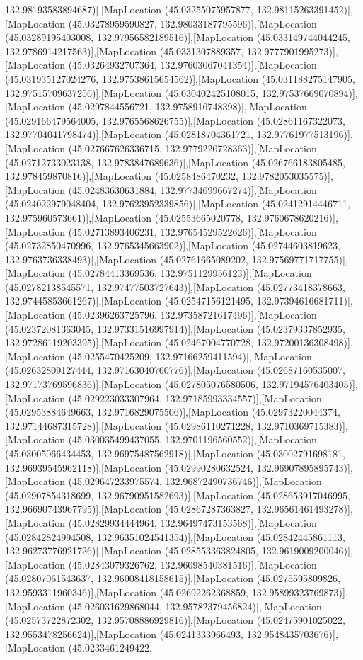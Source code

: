 132.98193583894687)],[MapLocation (45.03255075957877, 132.98115263391452)],[MapLocation (45.03278959590827, 132.98033187795596)],[MapLocation (45.03289195403008, 132.97956582189516)],[MapLocation (45.033149744044245, 132.9786914217563)],[MapLocation (45.0331307889357, 132.9777901995273)],[MapLocation (45.03264932707364, 132.97603067041354)],[MapLocation (45.031935127024276, 132.97538615654562)],[MapLocation (45.031188275147905, 132.97515709637256)],[MapLocation (45.030402425108015, 132.97537669070894)],[MapLocation (45.0297844556721, 132.9758916748398)],[MapLocation (45.029166479564005, 132.9765568626755)],[MapLocation (45.02861167322073, 132.97704041798474)],[MapLocation (45.02818704361721, 132.97761977513196)],[MapLocation (45.027667626336715, 132.9779220728363)],[MapLocation (45.02712733023138, 132.9783847689636)],[MapLocation (45.026766183805485, 132.978459870816)],[MapLocation (45.0258486470232, 132.9782053035575)],[MapLocation (45.02483630631884, 132.97734699667274)],[MapLocation (45.024022979048404, 132.97623952339856)],[MapLocation (45.02412914446711, 132.975960573661)],[MapLocation (45.02553665020778, 132.9760678620216)],[MapLocation (45.02713893406231, 132.97654529522626)],[MapLocation (45.02732850470996, 132.9765345663902)],[MapLocation (45.02744603819623, 132.9763736338493)],[MapLocation (45.02761665089202, 132.97569771717755)],[MapLocation (45.02784413369536, 132.9751129956123)],[MapLocation (45.02782138545571, 132.97477503727643)],[MapLocation (45.02773418378663, 132.97445853661267)],[MapLocation (45.02547156121495, 132.97394616681711)],[MapLocation (45.02396263725796, 132.97358721617496)],[MapLocation (45.02372081363045, 132.97331516997914)],[MapLocation (45.02379337852935, 132.97286119203395)],[MapLocation (45.02467004770728, 132.97200136308498)],[MapLocation (45.0255470425209, 132.97166259411594)],[MapLocation (45.02632809127444, 132.97163040760776)],[MapLocation (45.02687160535007, 132.97173769596836)],[MapLocation (45.027805076580506, 132.97194576403405)],[MapLocation (45.029223033307964, 132.97185993334557)],[MapLocation (45.02953884649663, 132.9716829075506)],[MapLocation (45.02973220044374, 132.97144687315728)],[MapLocation (45.02986110271228, 132.9710369715383)],[MapLocation (45.030035499437055, 132.9701196560552)],[MapLocation (45.03005066434453, 132.96975487562918)],[MapLocation (45.03002791698181, 132.96939545962118)],[MapLocation (45.02990280632524, 132.96907895895743)],[MapLocation (45.029647233975574, 132.96872490736746)],[MapLocation (45.02907854318699, 132.96790951582693)],[MapLocation (45.028653917046995, 132.96690743967795)],[MapLocation (45.02867287363827, 132.96561461493278)],[MapLocation (45.02829934444964, 132.96497473153568)],[MapLocation (45.02842824994508, 132.96351024541354)],[MapLocation (45.02842445861113, 132.96273776921726)],[MapLocation (45.028553363824805, 132.9619009200046)],[MapLocation (45.02843079326762, 132.96098540381516)],[MapLocation (45.02807061543637, 132.96008418158615)],[MapLocation (45.0275595809826, 132.9593311960346)],[MapLocation (45.02692262368859, 132.95899323769873)],[MapLocation (45.026031629868044, 132.95782379456824)],[MapLocation (45.02573722872302, 132.95708886929816)],[MapLocation (45.02475901025022, 132.9553478256624)],[MapLocation (45.0241333966493, 132.9548435703676)],[MapLocation (45.0233461249422, 